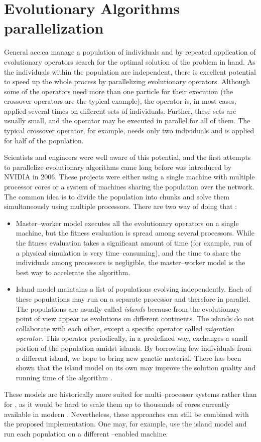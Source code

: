 \section{Evolutionary Algorithms parallelization}

General \acrlong{acc:ea} manage a population of individuals and by repeated application of evolutionary operators search for the optimal solution of the problem in hand. As the individuals within the population are independent, there is excellent potential to speed up the whole process by parallelizing evolutionary operators. Although some of the operators need more than one particle for their execution (the crossover operators are the typical example), the operator is, in most cases, applied several times on different sets of individuals. Further, these sets are usually small, and the operator may be executed in parallel for all of them. The typical crossover operator, for example, needs only two individuals and is applied for half of the population.

Scientists and engineers were well aware of this potential, and the first attempts to parallelize evolutionary algorithms came long before \cuda was introduced by NVIDIA \citep{PGAPack} in 2006. These projects were either using a single machine with multiple processor cores or a system of machines sharing the population over the network. The common idea is to divide the population into chunks and solve them simultaneously using multiple processors. There are two way of doing that \citep{CHENG2019514}:
\begin{itemize}
    \item Master--worker model executes all the evolutionary operators on a single machine, but the fitness evaluation is spread among several processors. While the fitness evaluation takes a significant amount of time (for example, run of a physical simulation is very time--consuming), and the time to share the individuals among processors is negligible, the master--worker model is the best way to accelerate the algorithm.
    \item Island model maintains a list of populations evolving independently. Each of these populations may run on a separate processor and therefore in parallel. The populations are usually called \emph{islands} because from the evolutionary point of view appear as evolutions on different continents. The islands do not collaborate with each other, except a specific operator called \emph{migration operator}. This operator periodically, in a predefined way, exchanges a small portion of the population amidst islands. By borrowing few individuals from a different island, we hope to bring new genetic material. There has been shown that the island model on its own may improve the solution quality and running time of the algorithm \citep{IslandModel}.
\end{itemize}
These models are historically more suited for multi--processor systems rather than for \gpuns, as it would be hard to scale them up to thousands of cores currently available in modern \gpuns. Nevertheless, these approaches can still be combined with the proposed implementation. One may, for example, use the island model and run each population on a different \gpuns--enabled machine.

